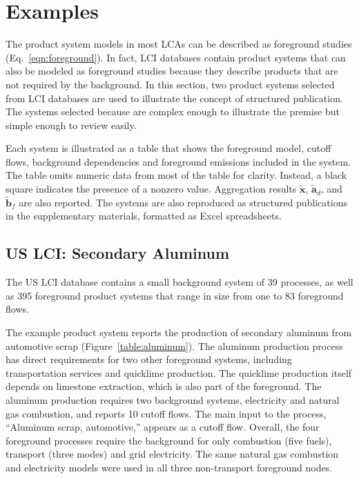 \section{Examples}

The product system models in most LCAs can be described as foreground studies (Eq.~\ref{eqn:foreground}).  In fact, LCI databases contain product systems that can also be modeled as foreground studies because they describe products that are not required by the background.  In this section, two product systems selected from LCI databases are used to illustrate the concept of structured publication.  The systems selected because are complex enough to illustrate the premise but simple enough to review easily.

Each system is illustrated as a table that shows the foreground model, cutoff flows, background dependencies and foreground emissions included in the system.  The table omits numeric data from most of the table for clarity. Instead, a black square indicates the presence of a nonzero value.  Aggregation results $\tilde{\mathbf{x}}$, $\tilde{\mathbf{a}}_d$, and $\tilde{\mathbf{b}}_f$ are also reported.  The systems are also reproduced as structured publications in the supplementary materials, formatted as Excel spreadsheets.

\subsection{US LCI: Secondary Aluminum}

The US LCI database contains a small background system of 39 processes, as well as 395 foreground product systems that range in size from one to 83 foreground flows.

The example product system  reports the production of secondary aluminum from automotive scrap (Figure~\ref{table:aluminum}).   The aluminum production process has direct requirements for two other foreground systems, including transportation services and quicklime production.  The quicklime production itself depends on limestone extraction, which is also part of the foreground.  The aluminum production requires two background systems, electricity and natural gas combustion, and reports 10 cutoff flows.  The main input to the process, ``Aluminum scrap, automotive,'' appears as a cutoff flow.  Overall, the four foreground processes require the background for only combustion (five fuels), transport (three modes) and grid electricity.  The same natural gas combustion and electricity models were used in all three non-transport foreground nodes.

